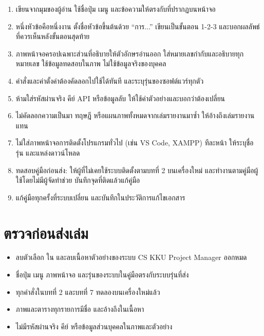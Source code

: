 \begin{enumerate}
  \item เขียนจากมุมของผู้อ่าน ใช้ชื่อปุ่ม เมนู และข้อความให้ตรงกับที่ปรากฏบนหน้าจอ
  \item หนึ่งหัวข้อคือหนึ่งงาน ตั้งชื่อหัวข้อขึ้นต้นด้วย ``การ...'' เขียนเป็นขั้นตอน 1-2-3
        และบอกผลลัพธ์ที่ควรเห็นหลังขั้นตอนสุดท้าย
  \item ภาพหน้าจอครอปเฉพาะส่วนที่อธิบายให้ตัวอักษรอ่านออก ใส่หมายเลขกำกับและอธิบายทุกหมายเลข
        ใช้ข้อมูลทดสอบในภาพ ไม่ใช้ข้อมูลจริงของบุคคล
  \item คำสั่งและค่าตั้งค่าต้องคัดลอกไปใช้ได้ทันที และระบุรุ่นของซอฟต์แวร์ทุกตัว
  \item ห้ามใส่รหัสผ่านจริง คีย์ API หรือข้อมูลลับ ให้ใช้ค่าตัวอย่างและบอกว่าต้องเปลี่ยน
  \item ไม่คัดลอกความเป็นมา ทฤษฎี หรือแผนภาพทั้งหมดจากเล่มรายงานมาซ้ำ ให้อ้างถึงเล่มรายงานแทน
  \item ไม่ใส่ภาพหน้าจอการติดตั้งโปรแกรมทั่วไป (เช่น VS Code, XAMPP) ทีละหน้า ให้ระบุชื่อ รุ่น และแหล่งดาวน์โหลด
  \item ทดสอบคู่มือก่อนส่ง: ให้ผู้ที่ไม่เคยใช้ระบบติดตั้งตามบทที่ 2 บนเครื่องใหม่
        และทำงานตามคู่มือผู้ใช้โดยไม่มีผู้จัดทำช่วย บันทึกจุดที่ติดแล้วแก้คู่มือ
  \item แก้คู่มือทุกครั้งที่ระบบเปลี่ยน และบันทึกในประวัติการแก้ไขเอกสาร
\end{enumerate}

\section*{ตรวจก่อนส่งเล่ม}

\begin{itemize}[label=$\square$]
  \item ลบตัวเลือก  ใน  และลบเนื้อหาตัวอย่างของระบบ CS KKU Project Manager ออกหมด
  \item ชื่อปุ่ม เมนู ภาพหน้าจอ และรุ่นของระบบในคู่มือตรงกับระบบรุ่นที่ส่ง
  \item ทุกคำสั่งในบทที่ 2 และบทที่ 7 ทดลองบนเครื่องใหม่แล้ว
  \item ภาพและตารางทุกรายการมีชื่อ และอ้างถึงในเนื้อหา
  \item ไม่มีรหัสผ่านจริง คีย์ หรือข้อมูลส่วนบุคคลในภาพและตัวอย่าง
\end{itemize}

